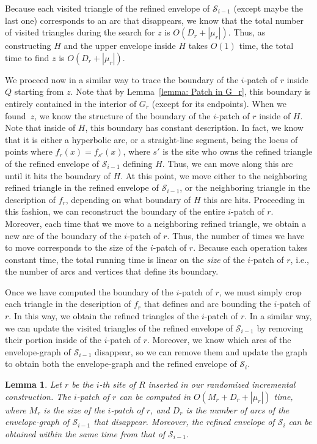 \documentclass[a4paper, 11pt]{article}
\newtheorem{lemma}[theorem]{Lemma}
\newcommand{\icell}[1][i]{${#1}$-patch\xspace}
\newcommand{\s}{\mathcal S}
\begin{document}
Because each visited triangle of the refined envelope of $\s_{i-1}$ (except maybe the last one) corresponds to an arc that disappears, we know that the total number of visited triangles during the search for $z$ is $O(D_r + |\mu_r|)$.
Thus, as constructing $H$ and the upper envelope inside $H$ takes $O(1)$ time, the total time to find $z$ is $O(D_r + |\mu_r|)$.

We proceed now in a similar way to trace the boundary of the \icell of $r$ inside $Q$ starting from $z$.
Note that by Lemma~\ref{lemma: Patch in G_r}, this boundary is entirely contained in the interior of $G_r$ (except for its endpoints). 
When we found~$z$, we know the structure of the boundary of the \icell of $r$ inside of $H$. 
Note that inside of $H$, this boundary has constant description. 
In fact, we know that it is either a hyperbolic arc, or a straight-line segment, being the locus of points where $f_r(x) = f_{s'}(x)$, where $s'$ is the site who owns the refined triangle of the refined envelope of $\s_{i-1}$ defining $H$.
Thus, we can move along this arc until it hits the boundary of $H$. 
At this point, we move either to the neighboring refined triangle in the refined envelope of $\s_{i-1}$, 
or the neighboring triangle in the description of $f_r$,  
depending on what boundary of $H$ this arc hits. 
Proceeding in this fashion, we can reconstruct the boundary of the entire \icell of $r$. 
Moreover, each time that we move to a neighboring refined triangle, we obtain a new arc of the boundary of the \icell of $r$. 
Thus, the number of times we have to move corresponds to the size of the \icell of $r$. 
Because each operation takes constant time, the total running time is linear on the \emph{size} of the \icell of $r$, i.e., the number of arcs and vertices that define its boundary.

Once we have computed the boundary of the \icell of $r$, we must simply crop each triangle in the description of $f_r$ that defines and arc bounding the \icell of $r$. 
In this way, we obtain the refined triangles of the \icell of $r$.
In a similar way, we can update the visited triangles of the refined envelope of $\s_{i-1}$ by removing their portion inside of the \icell of $r$.
Moreover, we know which arcs of the envelope-graph of $\s_{i-1}$ disappear, so we can remove them and update the graph to obtain both the envelope-graph and the refined envelope of $\s_i$. 


\begin{lemma}\label{lemma:Time to insert one site of R}
Let $r$ be the $i$-th site of $R$ inserted in our randomized incremental construction. 
The \icell of $r$ can be computed in $O(M_r + D_r + |\mu_r|)$ time, where $M_r$ is the size of the \icell of $r$, and $D_r$ is the number of arcs of the envelope-graph of $\s_{i-1}$ that disappear.
Moreover, the refined envelope of $\s_i$ can be obtained within the same time from that of $\s_{i-1}$.
\end{lemma}
\end{document}
